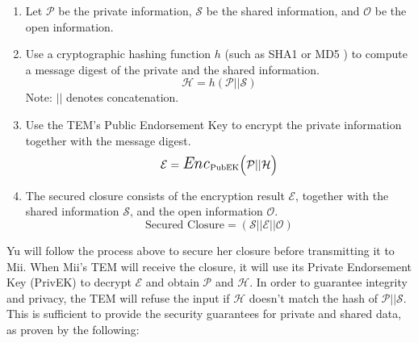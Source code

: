 \begin{enumerate}
  \item Let $\mathcal P$ be the private information, $\mathcal S$ be the shared
  information, and $\mathcal O$ be the open information.
  \item Use a cryptographic hashing function $h$ (such as SHA1
  \cite{eastlake2001rus} or MD5 \cite{rivest1992rmm}) to compute a message
  digest of the private and the shared information. $$\mathcal H = h(\mathcal P
  || \mathcal S)$$ Note: $||$ denotes concatenation.
  \item Use the TEM's Public Endorsement Key to encrypt the private information
  together with the message digest. $$\mathcal E =
  {\mbox{\Large \textit{Enc}}}_\textrm{PubEK}\Big(\mathcal P || \mathcal
  H\Big)$$
  \item The secured closure consists of the encryption result $\mathcal E$,
  together with the shared information $\mathcal S$, and the open information
  $\mathcal O$. $$\textrm{Secured Closure} = (\mathcal S || \mathcal E ||
  \mathcal O)$$
\end{enumerate}

Yu will follow the process above to secure her closure before transmitting it
to Mii. When Mii's TEM will receive the closure, it will use its Private
Endorsement Key (PrivEK) to decrypt $\mathcal E$ and obtain $\mathcal P$ and
$\mathcal H$. In order to guarantee integrity and privacy, the TEM will refuse
the input if $\mathcal H$ doesn't match the hash of $\mathcal P || \mathcal S$.
This is sufficient to provide the security guarantees for private and shared
data, as proven by the following:

